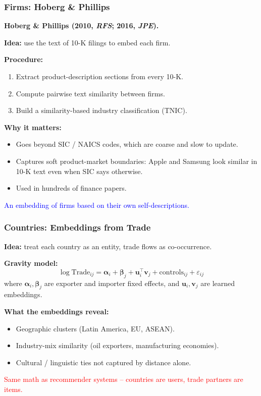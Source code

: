 \documentclass[notes,11pt, aspectratio=169]{beamer}
\newcommand{\vu}{\mathbf{u}}
\newcommand{\vv}{\mathbf{v}}
\begin{document}
\begin{frame}
\frametitle{Firms: Hoberg \& Phillips}

\textbf{Hoberg \& Phillips (2010, \emph{RFS}; 2016, \emph{JPE}).}

\vspace{6pt}
\textbf{Idea:} use the text of 10-K filings to embed each firm.

\vspace{4pt}
\textbf{Procedure:}
\begin{enumerate}
    \item Extract product-description sections from every 10-K.
    \item Compute pairwise text similarity between firms.
    \item Build a similarity-based industry classification (TNIC).
\end{enumerate}

\vspace{8pt}
\textbf{Why it matters:}
\begin{itemize}
    \item Goes beyond SIC / NAICS codes, which are coarse and slow to update.
    \item Captures soft product-market boundaries: Apple and Samsung look similar in 10-K text even when SIC says otherwise.
    \item Used in hundreds of finance papers.
\end{itemize}

\vspace{4pt}
\textcolor{blue}{An embedding of firms based on their own self-descriptions.}
\end{frame}

\begin{frame}
\frametitle{Countries: Embeddings from Trade}

\textbf{Idea:} treat each country as an entity, trade flows as co-occurrence.

\vspace{6pt}
\textbf{Gravity model:}
\[
    \log \text{Trade}_{ij} = \boldsymbol\alpha_i + \boldsymbol\beta_j + \vu_i^\top \vv_j + \text{controls}_{ij} + \varepsilon_{ij}
\]
where $\boldsymbol\alpha_i, \boldsymbol\beta_j$ are exporter and importer fixed effects, and $\vu_i, \vv_j$ are learned embeddings.

\vspace{8pt}
\textbf{What the embeddings reveal:}
\begin{itemize}
    \item Geographic clusters (Latin America, EU, ASEAN).
    \item Industry-mix similarity (oil exporters, manufacturing economies).
    \item Cultural / linguistic ties not captured by distance alone.
\end{itemize}

\vspace{6pt}
\textcolor{red}{Same math as recommender systems -- countries are users, trade partners are items.}
\end{frame}
\end{document}
